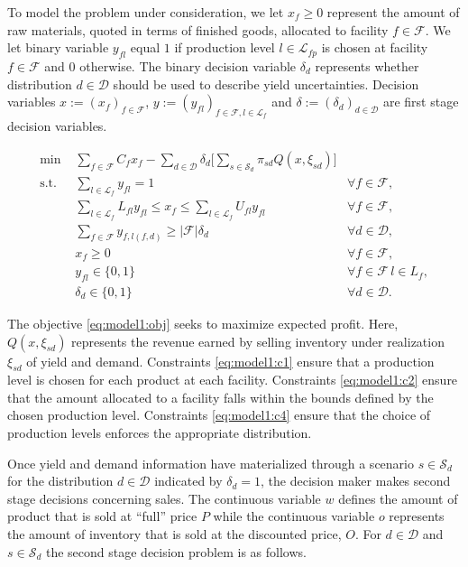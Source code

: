 \documentclass[12pt]{article}
\theoremstyle{thmstylethree}%
\newcommand{\mtc}[1] {\mathcal{#1}}
\begin{document}
To model the problem under consideration, we let $x_{f}\geq 0$ represent the amount of raw materials, quoted in terms of finished goods, allocated to facility $f \in \mathcal{F}$. We let binary variable $y_{fl}$ equal $1$ if production level $l \in \mathcal{L}_{fp}$ is chosen at facility $f \in \mathcal{F}$ and $0$ otherwise.  The binary decision variable $\delta_{d}$ represents whether distribution $d \in \mathcal{D}$ should be used to describe yield uncertainties. Decision variables $x:=(x_{f})_{f\in\mathcal{F}}$, $y:=(y_{fl})_{f\in\mathcal{F},l \in \mathcal{L}_{f}}$ and $\delta:=(\delta_{d})_{d\in\mathcal{D}}$ are first stage decision variables. 


\begin{subequations}\label{eq:ppp1}
\begin{align}
\label{eq:model1:obj}\min~&\sum_{f\in\mathcal{F}}C_{f}x_{f}-\sum_{d\in\mathcal{D}}\delta_{d}\Bigg[\sum_{s\in\mathcal{S}_{d}}\pi_{sd}Q(x,\xi_{sd})\Bigg] \\
\label{eq:model1:c1}\text{s.t. ~} &   \sum_{l\in\mathcal{L}_{f}}y_{fl} =1&\forall f\in\mathcal{F},  \\
\label{eq:model1:c2} &   \sum_{l\in\mathcal{L}_{f}}L_{fl}y_{fl} \leq x_{f}\leq \sum_{l\in\mathcal{L}_{f}}U_{fl}y_{fl}&\forall f\in\mathcal{F}, \\ 
\label{eq:model1:c4} &\sum_{f\in\mathcal{F}}y_{f,l(f,d)}\geq |\mathcal{F}|\delta_{d} &\forall d\in \mathcal{D}, \\
\label{eq:model1:fs_dvx} & x_{f} \geq 0  &\forall f\in\mathcal{F}, \\ 
\label{eq:model1:fs_dvy} & y_{fl} \in \{0,1\} &\forall f\in\mathcal{F}\, l \in L_{f}, \\
\label{eq:model1:fs_dvd} & \delta_{d} \in \{0,1\} &\forall d \in \mathcal{D}.
\end{align}
\end{subequations}

The objective \eqref{eq:model1:obj} seeks to maximize expected profit. Here, $Q(x,\xi_{sd})$ represents the revenue earned by selling inventory under realization $\xi_{sd}$ of yield and demand. 
Constraints \eqref{eq:model1:c1} ensure that a production level is chosen for each product at each facility. 
Constraints \eqref{eq:model1:c2} ensure that the amount allocated to a facility falls within the bounds defined by the chosen production level. Constraints \eqref{eq:model1:c4} ensure that the choice of production levels enforces the appropriate distribution. 

Once yield and demand information have materialized through a scenario $s\in\mathcal{S}_{d}$ for the distribution $d\in\mathcal{D}$ indicated by $\delta_{d}=1$, the decision maker makes second stage decisions concerning sales. 
The continuous variable $w$ defines the amount of product that is sold at ``full'' price $P$ while the continuous variable $o$ represents the amount of inventory that is sold at the discounted price, $O.$ For $d\in\mtc{D}$ and $s\in\mtc{S}_d$ the second stage decision problem is as follows. 
\end{document}
